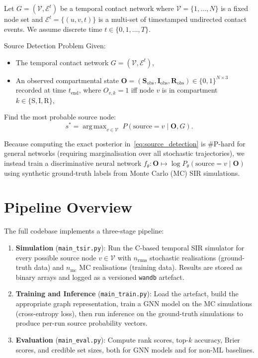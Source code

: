 \documentclass[12pt,a4paper]{report}
\DeclareMathOperator*{\argmax}{arg\,max}
\newcommand{\calV}{\mathcal{V}}
\newcommand{\calE}{\mathcal{E}}
\begin{document}
Let $G = (\calV, \calE^t)$ be a temporal contact network where $\calV =
\{1,\ldots,N\}$ is a fixed node set and $\calE^t = \{(u,v,t)\}$ is a
multi-set of timestamped undirected contact events. We assume discrete time
$t \in \{0,1,\ldots,T\}$.

\begin{definition}{Source Detection Problem}
Given:
\begin{itemize}[noitemsep]
  \item The temporal contact network $G = (\calV, \calE^t)$,
  \item An observed compartmental state $\mathbf{O} = (\mathbf{S}_{\text{obs}},
    \mathbf{I}_{\text{obs}}, \mathbf{R}_{\text{obs}}) \in \{0,1\}^{N \times 3}$
    recorded at time $t_{\text{end}}$, where $O_{v,k}=1$ iff node $v$ is in
    compartment $k \in \{\mathrm{S},\mathrm{I},\mathrm{R}\}$,
\end{itemize}
Find the most probable source node:
\begin{equation}
  s^* = \argmax_{v \in \calV} \; P(\text{source} = v \mid \mathbf{O}, G).
  \label{eq:source_detection}
\end{equation}
\end{definition}

Because computing the exact posterior in~\eqref{eq:source_detection} is
\#P-hard for general networks (requiring marginalisation over all stochastic
trajectories), we instead train a discriminative neural network
$f_\theta: \mathbf{O} \mapsto \log P_\theta(\text{source} = v \mid \mathbf{O})$
using synthetic ground-truth labels from Monte Carlo (MC) SIR simulations.

\section{Pipeline Overview}

The full codebase implements a three-stage pipeline:

\begin{enumerate}
  \item \textbf{Simulation} (\texttt{main\_tsir.py}): Run the C-based temporal
    SIR simulator for every possible source node $v \in \calV$ with $n_{\text{runs}}$
    stochastic realisations (ground-truth data) and $n_{\text{mc}}$ MC realisations
    (training data). Results are stored as binary arrays and logged as a versioned
    \texttt{wandb} artefact.
  \item \textbf{Training and Inference} (\texttt{main\_train.py}): Load the
    artefact, build the appropriate graph representation, train a GNN model on
    the MC simulations (cross-entropy loss), then run inference on the
    ground-truth simulations to produce per-run source probability vectors.
  \item \textbf{Evaluation} (\texttt{main\_eval.py}): Compute rank scores,
    top-$k$ accuracy, Brier scores, and credible set sizes, both for GNN models
    and for non-ML baselines.
\end{enumerate}
\end{document}
